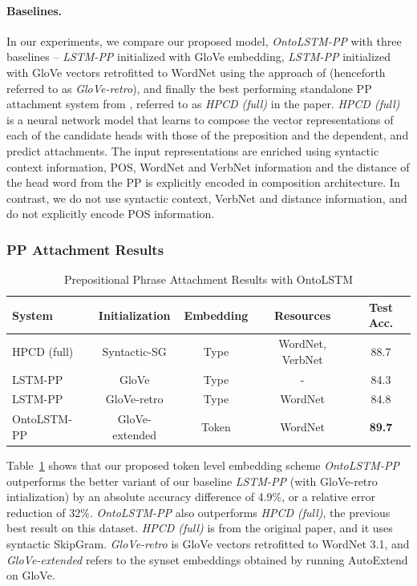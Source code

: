 \paragraph{Baselines.} In our experiments, we compare our proposed model, \textit{OntoLSTM-PP} with three baselines -- \textit{LSTM-PP} initialized with GloVe embedding, \textit{LSTM-PP} initialized with GloVe vectors retrofitted to WordNet using the approach of \cite{faruqui:15} (henceforth referred to as \textit{GloVe-retro}), and finally the best performing standalone PP attachment system from \cite{belinkov2014exploring}, referred to as \textit{HPCD (full)} in the paper. \textit{HPCD (full)} is a neural network model that learns to compose the vector representations of each of the candidate heads with those of the preposition and the dependent, and predict attachments. The input representations are enriched using syntactic context information, POS, WordNet and VerbNet \citep{kipper2008large} information and the distance of the head word from the PP is explicitly encoded in composition architecture. In contrast, we do not use syntactic context, VerbNet and distance information, and do not explicitly encode POS information.

\subsubsection{PP Attachment Results}
\begin{table}
    \centering
    \begin{tabular}{lcccc}
    \toprule
    \textbf{System} & \textbf{Initialization} & \textbf{Embedding} & \textbf{Resources} & \textbf{Test Acc.}\\
    \midrule
    HPCD (full) & Syntactic-SG & Type & WordNet, VerbNet & 88.7 \\
    \midrule
    LSTM-PP  & GloVe & Type & - & 84.3 \\
    LSTM-PP & GloVe-retro & Type & WordNet & 84.8 \\
    OntoLSTM-PP & GloVe-extended & Token & WordNet & \textbf{89.7} \\
    \bottomrule
    \end{tabular}
    \caption{Prepositional Phrase Attachment Results with OntoLSTM}
    \label{tab:ontolstm_direct_ppa_results}
\end{table}
Table~\ref{tab:ontolstm_direct_ppa_results} shows that our proposed token level embedding scheme \textit{OntoLSTM-PP} outperforms the better variant of our baseline \textit{LSTM-PP} (with GloVe-retro intialization) by an absolute accuracy difference of 4.9\%, 
or a relative error reduction of 32\%.
\textit{OntoLSTM-PP} also outperforms \textit{HPCD (full)}, the previous best result on this dataset. \textit{HPCD (full)} is from the original paper, and it uses syntactic SkipGram. \textit{GloVe-retro} is GloVe vectors retrofitted \citep{faruqui:15} to WordNet 3.1, and \textit{GloVe-extended} refers to the synset embeddings obtained by running AutoExtend \citep{rothe:15} on GloVe.

